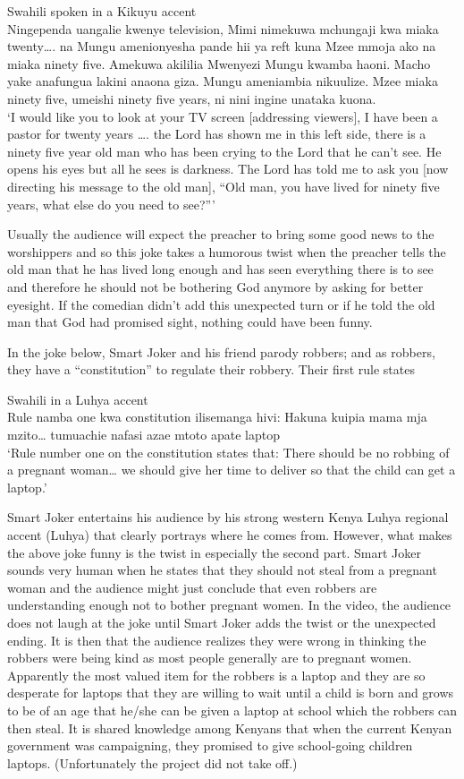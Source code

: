 \documentclass[output=paper]{langsci/langscibook}
\begin{document}
\ea\label{ex:muaka:8}
Swahili spoken in a Kikuyu accent\\ 
Ningependa uangalie kwenye television, Mimi nimekuwa mchungaji kwa miaka twenty…. na Mungu amenionyesha pande hii ya reft kuna Mzee mmoja ako na miaka ninety five. Amekuwa akililia Mwenyezi Mungu kwamba haoni. Macho yake anafungua lakini anaona giza. Mungu ameniambia nikuulize. Mzee miaka ninety five, umeishi ninety five years, ni nini ingine unataka kuona.\\
\glt ‘I would like you to look at your TV screen [addressing viewers], I have been a pastor for twenty years …. the Lord has shown me in this left side, there is a ninety five year old man who has been crying to the Lord that he can’t see. He opens his eyes but all he sees is darkness. The Lord has told me to ask you [now directing his message to the old man], “Old man, you have lived for ninety five years, what else do you need to see?”’ \citep{ChurchillRaw2014}
\z

Usually the audience will expect the preacher to bring some good news to the worshippers and so this joke takes a humorous twist when the preacher tells the old man that he has lived long enough and has seen everything there is to see and therefore he should not be bothering God anymore by asking for better eyesight. If the comedian didn’t add this unexpected turn or if he told the old man that God had promised sight, nothing could have been funny. 

In the joke below, Smart Joker and his friend parody robbers; and as robbers, they have a “constitution” to regulate their robbery. Their first rule states

\ea\label{ex:muaka:9}
{Swahili in a Luhya accent}\\
 Rule namba one kwa constitution ilisemanga hivi: Hakuna kuipia mama mja mzito… tumuachie nafasi azae mtoto apate laptop\\
\glt ‘Rule number one on the constitution states that: There should be no robbing of a pregnant woman… we should give her time to deliver so that the child can get a laptop.’ \citep{Churchill2013}
\z

Smart Joker entertains his audience by his strong western Kenya Luhya regional accent (Luhya) that clearly portrays where he comes from. However, what makes the above joke funny is the twist in especially the second part. Smart Joker sounds very human when he states that they should not steal from a pregnant woman and the audience might just conclude that even robbers are understanding enough not to bother pregnant women. In the video, the audience does not laugh at the joke until Smart Joker adds the twist or the unexpected ending. It is then that the audience realizes they were wrong in thinking the robbers were being kind as most people generally are to pregnant women. Apparently the most valued item for the robbers is a laptop and they are so desperate for laptops that they are willing to wait until a child is born and grows to be of an age that he/she can be given a laptop at school which the robbers can then steal. It is shared knowledge among Kenyans that when the current Kenyan government was campaigning, they promised to give school-going children laptops. (Unfortunately the project did not take off.) 
\end{document}
